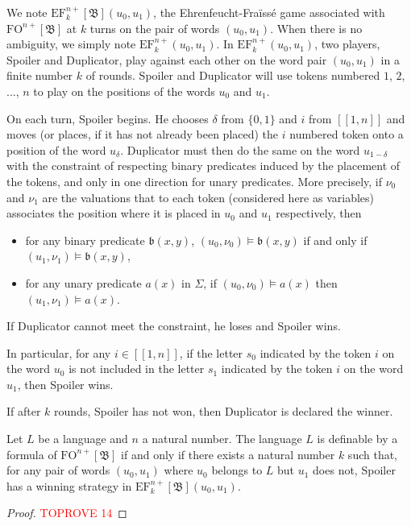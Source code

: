 \documentclass[a4paper,UKenglish,cleveref, autoref, thm-restate]{lipics-v2021}
\newcommand{\FO}{\mathrm{FO}}
\newcommand{\EF}{\mathrm{EF}}
\newcommand{\val}{\nu}
\newcommand{\bin}{\mathfrak{B}}
\renewcommand{\b}{\mathfrak{b}}
\begin{document}
\begin{definition}
    We note $\EF_k^{n+}[\bin](u_0,u_1)$, the Ehrenfeucht-Fraïssé game associated with $\FO^{n+}[\bin]$ at $k$ turns on the pair of words $(u_0,u_1)$. When there is no ambiguity, we simply note $\EF_k^{n+}(u_0,u_1)$. In $\EF_k^{n+}(u_0,u_1)$, two players, Spoiler and Duplicator, play against each other on the word pair $(u_0,u_1)$ in a finite number $k$ of rounds. Spoiler and Duplicator will use tokens numbered $1$, $2$, ..., $n$ to play on the positions of the words $u_0$ and $u_1$.
    
    On each turn, Spoiler begins. He chooses $\delta$ from $\{0,1\}$ and $i$ from $[\![1,n]\!]$ and moves (or places, if it has not already been placed) the $i$ numbered token onto a position of the word $u_{\delta}$. Duplicator must then do the same on the word $u_{1-\delta}$ with the constraint of respecting binary predicates induced by the placement of the tokens, and only in one direction for unary predicates. More precisely, if $\val_0$ and $\val_1$ are the valuations that to each token (considered here as variables) associates the position where it is placed in $u_0$ and $u_1$ respectively, then
    \begin{itemize}
        \item for any binary predicate $\b(x,y)$, $(u_0,\val_0)\models\b(x,y)$ if and only if $(u_1,\val_1)\models\b(x,y)$,
        \item for any unary predicate $a(x)$ in $\Sigma$, if $(u_0,\val_0)\models a(x)$ then $(u_1,\val_1)\models a(x)$.
    \end{itemize}
    
    If Duplicator cannot meet the constraint, he loses and Spoiler wins.

    In particular, for any $i\in[\![1,n]\!]$, if the letter $s_0$ indicated by the token $i$ on the word $u_0$ is not included in the letter $s_1$ indicated by the token $i$ on the word $u_1$, then Spoiler wins.

    If after $k$ rounds, Spoiler has not won, then Duplicator is declared the winner.
\end{definition}






\begin{theorem} \label{EF2+}
    Let $L$ be a language and $n$ a natural number. The language $L$ is definable by a formula of $\FO^{n+}[\bin]$ if and only if there exists a natural number $k$ such that, for any pair of words $(u_0,u_1)$ where $u_0$ belongs to $L$ but $u_1$ does not, Spoiler has a winning strategy in $\EF_k^{n+}[\bin](u_0,u_1)$.
\end{theorem}



\begin{proof}\textcolor{red}{TOPROVE 14}\end{proof}
\end{document}
